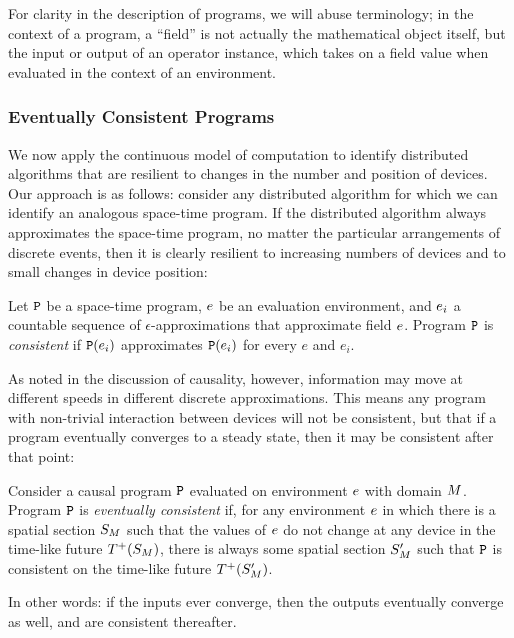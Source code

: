\documentclass[12pt,a4paper,twoside,openright]{book}
\begin{document}
For clarity in the description of programs, we will abuse terminology; in the context of a program, a ``field'' is not actually the mathematical object itself, but the input or output of an operator instance, which takes on a field value when evaluated in the context of an environment.

\subsubsection{Eventually Consistent Programs}

We now apply the continuous model of computation to identify distributed algorithms that are resilient to changes in the number and position of devices.
%
Our approach is as follows: consider any distributed algorithm for which we can identify an analogous space-time program.
%
If the distributed algorithm always approximates the space-time program, no matter the particular arrangements of discrete events, then it is clearly resilient to increasing numbers of devices and to small changes in device position:
%
\begin{thrdefn}
  Let $\texttt{P}$ be a space-time program, $e$ be an evaluation environment, and $e_i$ a countable sequence of $\epsilon$-approximations that approximate field $e$.
  Program $\texttt{P}$ is {\em consistent} if $\texttt{P}(e_i)$ approximates $\texttt{P}(e_i)$ for every $e$ and $e_i$.
\end{thrdefn}
\noindent
As noted in the discussion of causality, however, information may move at different speeds in different discrete approximations.  This means any program with non-trivial interaction between devices will not be consistent, but that if a program eventually converges to a steady state, then it may be consistent after that point:
\begin{thrdefn}
  Consider a causal program $\texttt{P}$ evaluated on environment $e$ with domain $M$.  Program $\texttt{P}$ is {\em eventually consistent} if, for any environment $e$ in which there is a spatial section $S_{M}$ such that the values of $e$ do not change at any device in the time-like future $T^+({S_{M}})$, there is always some spatial section $S_{M}'$ such that $\texttt{P}$ is consistent on the time-like future $T^+({S_{M}'})$.
\end{thrdefn}
\noindent
In other words: if the inputs ever converge, then the outputs eventually converge as well, and are consistent thereafter.
\end{document}
